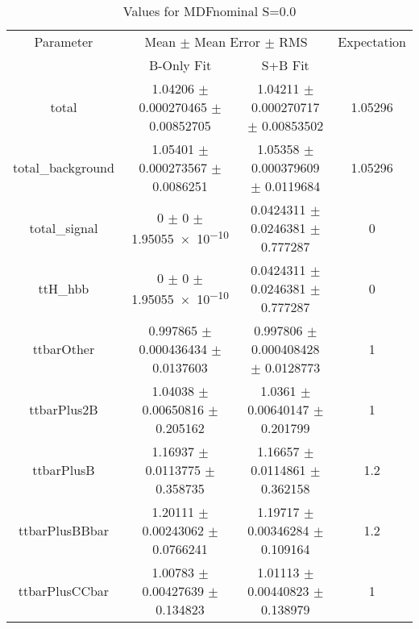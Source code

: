 \begin{table}
\centering
\caption{Values for MDFnominal S=0.0}
\begin{tabular}{cccc}
\toprule
Parameter & \multicolumn{2}{c}{Mean $\pm$ Mean Error $\pm$ RMS} & Expectation\\
 & B-Only Fit & S+B Fit & \\
\midrule
total & \num{1.04206} $\pm$ \num{0.000270465} $\pm$ \num{0.00852705} & \num{1.04211} $\pm$ \num{0.000270717} $\pm$ \num{0.00853502} & \num{1.05296}\\
total\_background & \num{1.05401} $\pm$ \num{0.000273567} $\pm$ \num{0.0086251} & \num{1.05358} $\pm$ \num{0.000379609} $\pm$ \num{0.0119684} & \num{1.05296}\\
total\_signal & \num{0} $\pm$ \num{0} $\pm$ \num{1.95055e-10} & \num{0.0424311} $\pm$ \num{0.0246381} $\pm$ \num{0.777287} & \num{0}\\
ttH\_hbb & \num{0} $\pm$ \num{0} $\pm$ \num{1.95055e-10} & \num{0.0424311} $\pm$ \num{0.0246381} $\pm$ \num{0.777287} & \num{0}\\
ttbarOther & \num{0.997865} $\pm$ \num{0.000436434} $\pm$ \num{0.0137603} & \num{0.997806} $\pm$ \num{0.000408428} $\pm$ \num{0.0128773} & \num{1}\\
ttbarPlus2B & \num{1.04038} $\pm$ \num{0.00650816} $\pm$ \num{0.205162} & \num{1.0361} $\pm$ \num{0.00640147} $\pm$ \num{0.201799} & \num{1}\\
ttbarPlusB & \num{1.16937} $\pm$ \num{0.0113775} $\pm$ \num{0.358735} & \num{1.16657} $\pm$ \num{0.0114861} $\pm$ \num{0.362158} & \num{1.2}\\
ttbarPlusBBbar & \num{1.20111} $\pm$ \num{0.00243062} $\pm$ \num{0.0766241} & \num{1.19717} $\pm$ \num{0.00346284} $\pm$ \num{0.109164} & \num{1.2}\\
ttbarPlusCCbar & \num{1.00783} $\pm$ \num{0.00427639} $\pm$ \num{0.134823} & \num{1.01113} $\pm$ \num{0.00440823} $\pm$ \num{0.138979} & \num{1}\\
\bottomrule
\end{tabular}
\end{table}